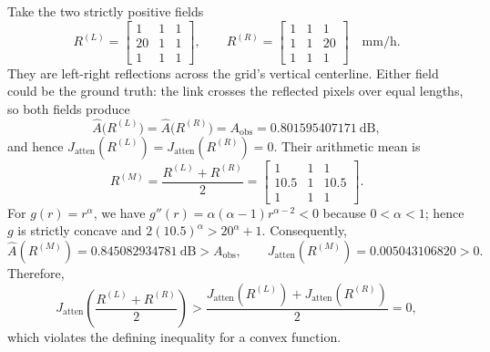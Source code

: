 \documentclass[a4paper,fleqn]{cas-sc}
\begin{document}
Take the two strictly positive fields
\[
R^{(L)}=\begin{bmatrix}1&1&1\\20&1&1\\1&1&1\end{bmatrix},
\qquad
R^{(R)}=\begin{bmatrix}1&1&1\\1&1&20\\1&1&1\end{bmatrix}
\quad \si{\milli\meter\per\hour}.
\]
They are left-right reflections across the grid's vertical centerline.  Either
field could be the ground truth: the link crosses the reflected pixels over
equal lengths, so both fields produce
\[
\widehat A\bigl(R^{(L)}\bigr)=\widehat A\bigl(R^{(R)}\bigr)
=A_{\mathrm{obs}}=0.801595407171\ \si{\deci\bel},
\]
and hence
$J_{\mathrm{atten}}(R^{(L)})=J_{\mathrm{atten}}(R^{(R)})=0$.
Their arithmetic mean is
\[
R^{(M)}=\frac{R^{(L)}+R^{(R)}}{2}
=\begin{bmatrix}1&1&1\\10.5&1&10.5\\1&1&1\end{bmatrix}.
\]
For $g(r)=r^\alpha$, we have
$g''(r)=\alpha(\alpha-1)r^{\alpha-2}<0$ because $0<\alpha<1$; hence $g$ is
strictly concave and
$2(10.5)^\alpha>20^\alpha+1$.  Consequently,
\[
\widehat A(R^{(M)})=0.845082934781\ \si{\deci\bel}>A_{\mathrm{obs}},
\qquad
J_{\mathrm{atten}}(R^{(M)})=0.005043106820>0.
\]
Therefore,
\[
J_{\mathrm{atten}}\!\left(\frac{R^{(L)}+R^{(R)}}{2}\right)
>
\frac{J_{\mathrm{atten}}(R^{(L)})+J_{\mathrm{atten}}(R^{(R)})}{2}=0,
\]
which violates the defining inequality for a convex function.
\end{document}
